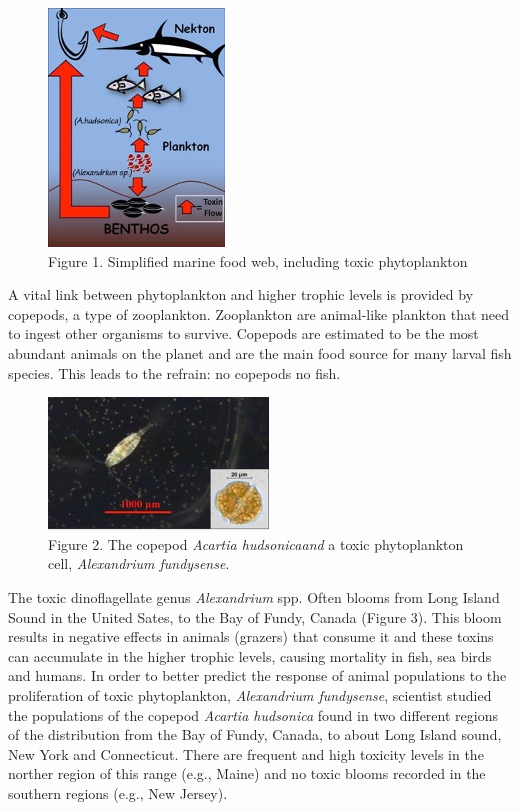 \documentclass[
]{book}
\begin{document}
\begin{figure}
\centering
\includegraphics{images/figure1.png}
\caption{Figure 1. Simplified marine food web, including toxic phytoplankton}
\end{figure}

A vital link between phytoplankton and higher trophic levels is provided by copepods, a type of zooplankton. Zooplankton are animal-like plankton that need to ingest other organisms to survive. Copepods are estimated to be the most abundant animals on the planet and are the main food source for many larval fish species. This leads to the refrain: no copepods no fish.

\begin{figure}
\centering
\includegraphics{images/figure2.png}
\caption{Figure 2. The copepod \emph{Acartia hudsonicaand} a toxic phytoplankton cell, \emph{Alexandrium fundysense}.}
\end{figure}

The toxic dinoflagellate genus \emph{Alexandrium} spp. Often blooms from Long Island Sound in the United Sates, to the Bay of Fundy, Canada (Figure 3). This bloom results in negative effects in animals (grazers) that consume it and these toxins can accumulate in the higher trophic levels, causing mortality in fish, sea birds and humans. In order to better predict the response of animal populations to the proliferation of toxic phytoplankton, \emph{Alexandrium fundysense}, scientist studied the populations of the copepod \emph{Acartia hudsonica} found in two different regions of the distribution from the Bay of Fundy, Canada, to about Long Island sound, New York and Connecticut. There are frequent and high toxicity levels in the norther region of this range (e.g., Maine) and no toxic blooms recorded in the southern regions (e.g., New Jersey).
\end{document}
